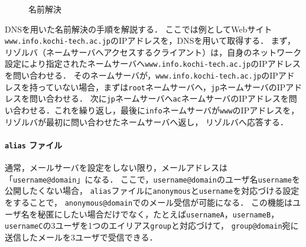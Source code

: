 \begin{wrapfigure}{r}[0mm]{.45\textwidth}
    \centering
    
    \caption{名前解決}
    \vspace{-.5cm}
\end{wrapfigure}
DNSを用いた名前解決の手順を解説する．
ここでは例としてWebサイト\texttt{www.info.kochi-tech.ac.jp}のIPアドレスを，DNSを用いて取得する．
まず，リゾルバ（ネームサーバへアクセスするクライアント）は，自身のネットワーク設定により指定されたネームサーバへ\texttt{www.info.kochi-tech.ac.jp}のIPアドレスを問い合わせる．
そのネームサーバが，\texttt{www.info.kochi-tech.ac.jp}のIPアドレスを持っていない場合，まずは\texttt{root}ネームサーバへ，\texttt{jp}ネームサーバのIPアドレスを問い合わせる．
次に\texttt{jp}ネームサーバへ\texttt{ac}ネームサーバのIPアドレスを問い合わせる．これを繰り返し，最後に\texttt{info}ネームサーバが\texttt{www}のIPアドレスを，リゾルバが最初に問い合わせたネームサーバへ返し，
リゾルバへ応答する．\hfill\cite[p.8]{DNSBIND}
\newcommand{\alias}{\texttt{alias}}
\newcommand{\user}{ユーザ}
\paragraph{\texttt{\bfseries alias} ファイル}
通常，メールサーバを設定をしない限り，メールアドレスは「\texttt{username@domain}」になる．
ここで，\texttt{username@domain}の\user 名\texttt{username}を公開したくない場合，
\alias ファイルに\texttt{anonymous}と\texttt{username}を対応づける設定をすることで，
\texttt{anonymous@domain}でのメール受信が可能になる．
この機能は\user 名を秘匿にしたい場合だけでなく，たとえば\texttt{usernameA}，\texttt{usernameB}，\texttt{usernameC}の3\user を1つのエイリアス\texttt{group}と対応づけて，
\texttt{group@domain}宛に送信したメールを3\user で受信できる．